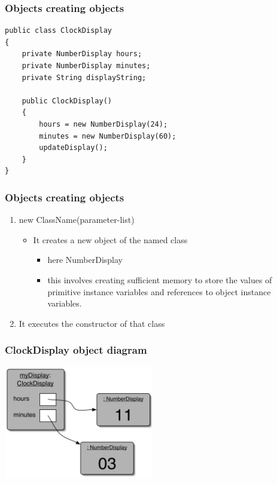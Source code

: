 \documentclass{beamer}
\begin{document}
\begin{frame}[fragile]
\frametitle{Objects creating objects}
\begin{lstlisting}
public class ClockDisplay
{
    private NumberDisplay hours;
    private NumberDisplay minutes;
    private String displayString; 
    
    public ClockDisplay()‏
    {
        hours = new NumberDisplay(24);
        minutes = new NumberDisplay(60);
        updateDisplay();
    }
}
\end{lstlisting}
\end{frame}

\begin{frame}
\frametitle{Objects creating objects}
\begin{enumerate}
\item new ClassName(parameter-list)‏
\begin{itemize}
\item It creates a new object of the named class
\begin{itemize}
\item here NumberDisplay
\item this involves creating sufficient memory to store the values of primitive instance variables and references to object instance variables.
\end{itemize}
\end{itemize}
\item It executes the constructor of that class
\end{enumerate}
\end{frame}

\begin{frame} 
\frametitle{ClockDisplay object diagram}
\begin{center}
\includegraphics[height=5cm, keepaspectratio]{./figures/object}
\end{center}
\end{frame}
\end{document}
